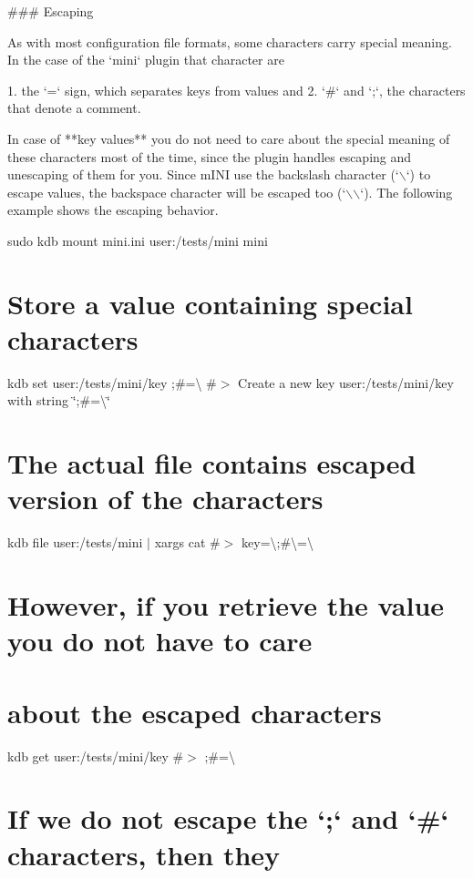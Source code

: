 \begin{DoxyCode}
### Escaping

As with most configuration file formats, some characters carry special meaning. In the case of the `mini`
       plugin that character are

1. the `=` sign, which separates keys from values and
2. `#` and `;`, the characters that denote a comment.

In case of **key values** you do not need to care about the special meaning of these characters most of the
       time, since the plugin handles escaping and unescaping of them for you. Since mINI use the backslash
       character (`\(\backslash\)`) to escape values, the backspace character will be escaped too (`\(\backslash\)\(\backslash\)`). The following example shows
       the escaping behavior.
\end{DoxyCode}
 sudo kdb mount mini.\+ini user\+:/tests/mini mini\hypertarget{autotoc_md371_autotoc_md381}{}\section{Store a value containing special characters}\label{autotoc_md371_autotoc_md381}
kdb set user\+:/tests/mini/key \textquotesingle{};\#=\textbackslash{}\textquotesingle{} \#$>$ Create a new key user\+:/tests/mini/key with string \char`\"{};\#=\textbackslash{}\char`\"{}\hypertarget{autotoc_md371_autotoc_md382}{}\section{The actual file contains escaped version of the characters}\label{autotoc_md371_autotoc_md382}
kdb file user\+:/tests/mini $\vert$ xargs cat \#$>$ key=\textbackslash{};\#\textbackslash{}=\textbackslash{}\hypertarget{autotoc_md371_autotoc_md383}{}\section{However, if you retrieve the value you do not have to care}\label{autotoc_md371_autotoc_md383}
\hypertarget{autotoc_md371_autotoc_md384}{}\section{about the escaped characters}\label{autotoc_md371_autotoc_md384}
kdb get user\+:/tests/mini/key \#$>$ ;\#=\textbackslash{}\hypertarget{autotoc_md371_autotoc_md385}{}\section{If we do not escape the `;` and `\#` characters, then they}\label{autotoc_md371_autotoc_md385}
